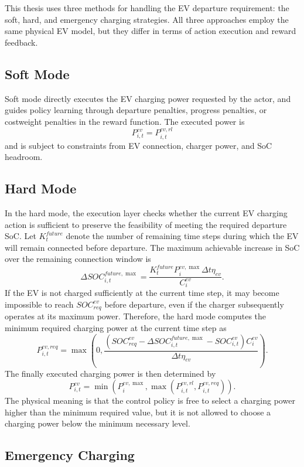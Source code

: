 This thesis uses three methods for handling the EV departure requirement: the soft, hard, and emergency charging strategies. All three approaches employ the same physical EV model, but they differ in terms of action execution and reward feedback.

\subsection{Soft Mode}

Soft mode directly executes the EV charging power requested by the actor, and guides policy learning through departure penalties, progress penalties, or costweight penalties in the reward function. The executed power is
\[
  P^{ev}_{i,t}=P^{ev,rl}_{i,t}
\]
and is subject to constraints from EV connection, charger power, and SoC headroom. 

\subsection{Hard Mode}

In the hard mode, the execution layer checks whether the current EV charging action is sufficient to preserve the feasibility of meeting the required departure SoC. Let \(K^{future}_t\) denote the number of remaining time steps during which the EV will remain connected before departure. The maximum achievable increase in SoC over the remaining connection window is
\[
  \Delta SOC^{future,\max}_{i,t}
  =
  \frac{K^{future}_tP^{ev,\max}_i\Delta t\eta_{ev}}{C^{ev}_i}.
\]
If the EV is not charged sufficiently at the current time step, it may become impossible to reach \(SOC^{ev}_{req}\) before departure, even if the charger subsequently operates at its maximum power. Therefore, the hard mode computes the minimum required charging power at the current time step as
\[
  P^{ev,req}_{i,t}
  =
  \max
  \left(
  0,
  \frac{(SOC^{ev}_{req}-\Delta SOC^{future,\max}_{i,t}-SOC^{ev}_{i,t})C^{ev}_i}
  {\Delta t\eta_{ev}}
  \right).
\]
The finally executed charging power is then determined by
\[
  P^{ev}_{i,t}
  =
  \min
  \left(
  P^{ev,\max}_i,
  \max(P^{ev,rl}_{i,t},P^{ev,req}_{i,t})
  \right).
\]
The physical meaning is that the control policy is free to select a charging power higher than the minimum required value, but it is not allowed to choose a charging power below the minimum necessary level.

\subsection{Emergency Charging}

